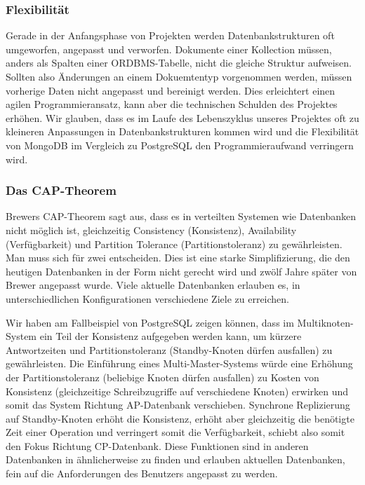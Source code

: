 \subsubsection{Flexibilität}
Gerade in der Anfangsphase von Projekten werden Datenbankstrukturen oft umgeworfen, angepasst und verworfen. Dokumente einer Kollection müssen, anders als Spalten einer ORDBMS-Tabelle, nicht die gleiche Struktur aufweisen. Sollten also Änderungen an einem Dokuemtentyp vorgenommen werden, müssen vorherige Daten nicht angepasst und bereinigt werden. Dies erleichtert einen agilen Programmieransatz, kann aber die technischen Schulden des Projektes erhöhen. Wir glauben, dass es im Laufe des Lebenszyklus unseres Projektes oft zu kleineren Anpassungen in Datenbankstrukturen kommen wird und die Flexibilität von MongoDB im Vergleich zu PostgreSQL den Programmieraufwand verringern wird.

\subsubsection{Das CAP-Theorem}
Brewers CAP-Theorem sagt aus, dass es in verteilten Systemen wie Datenbanken nicht möglich ist, gleichzeitig Consistency (Konsistenz), Availability (Verfügbarkeit) und Partition Tolerance (Partitionstoleranz) zu gewährleisten. Man muss sich für zwei entscheiden. %
Dies ist eine starke Simplifizierung, die den heutigen Datenbanken in der Form nicht gerecht wird und zwölf Jahre später von Brewer angepasst wurde. 
Viele aktuelle Datenbanken erlauben es, in unterschiedlichen Konfigurationen verschiedene Ziele zu erreichen. 
  
Wir haben am Fallbeispiel von PostgreSQL zeigen können, dass im Multiknoten-System ein Teil der Konsistenz aufgegeben werden kann, um kürzere Antwortzeiten und Partitionstoleranz (Standby-Knoten dürfen ausfallen) zu gewährleisten. Die Einführung eines Multi-Master-Systems würde eine Erhöhung der Partitionstoleranz (beliebige Knoten dürfen ausfallen) zu Kosten von Konsistenz (gleichzeitige Schreibzugriffe auf verschiedene Knoten) erwirken und somit das System Richtung AP-Datenbank verschieben. Synchrone Replizierung auf Standby-Knoten erhöht die Konsistenz, erhöht aber gleichzeitig die benötigte Zeit einer Operation und verringert somit die Verfügbarkeit, schiebt also somit den Fokus Richtung CP-Datenbank. Diese Funktionen sind in anderen Datenbanken in ähnlicherweise zu finden und erlauben aktuellen Datenbanken, fein auf die Anforderungen des Benutzers angepasst zu werden.



